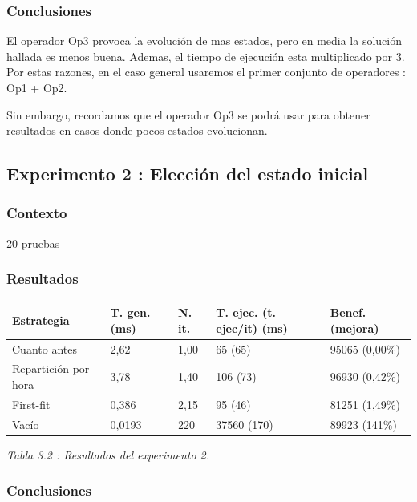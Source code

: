 \documentclass{article}
\begin{document}
\subsubsection{Conclusiones}

El operador Op3 provoca la evolución de mas estados, pero en media la solución
hallada es menos buena. Ademas, el tiempo de ejecución esta multiplicado por 3.
Por estas razones, en el caso general usaremos el primer conjunto de operadores
: Op1 + Op2.

Sin embargo, recordamos que el operador Op3 se podrá usar para obtener
resultados en casos donde pocos estados evolucionan.

\subsection{Experimento 2 : Elección del estado inicial}


\subsubsection{Contexto}

20 pruebas

\subsubsection{Resultados}

\begin{center}
\begin{tabular}{|l|l|l|l|l|}
\hline
Estrategia & T. gen. (ms) & N. it. & T. ejec. (t. ejec/it) (ms) & Benef.
(mejora)\\
\hline
Cuanto antes & 2,62 & 1,00 & 65 (65) & 95065 (0,00\%)\\
\hline
Repartición por hora & 3,78 & 1,40 & 106 (73) & 96930 (0,42\%)\\
\hline
First-fit & 0,386 & 2,15 & 95 (46) & 81251 (1,49\%)\\
\hline
Vacío & 0,0193 & 220 & 37560 (170) & 89923 (141\%)\\
\hline
\end{tabular}
{\it Tabla 3.2 : Resultados del experimento 2.}
\end{center}

\subsubsection{Conclusiones}
\end{document}
